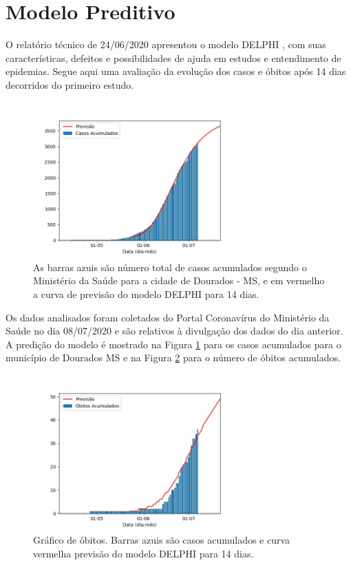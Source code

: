 \documentclass[12pt]{article}
\begin{document}
\section{Modelo Preditivo}\label{sec:predit}

O relatório técnico de 24/06/2020 apresentou o modelo DELPHI \cite{delphi}, com suas características, defeitos e possibilidades de ajuda em estudos e entendimento de epidemias. Segue aqui uma avaliação da evolução dos casos e óbitos após 14 dias decorridos do primeiro estudo. 

\begin{figure}[!htb]
  \centering
  \includegraphics[width = 8cm]{figs/Fig_Brasil_MS_Dourados_casos_20200708.jpg}
  \caption{As barras azuis são número total de casos acumulados segundo o Ministério da Saúde para a cidade de Dourados - MS, e em vermelho a curva de previsão do modelo DELPHI para 14 dias.}
  \label{proj_casos}
 \end{figure}
 
Os dados analisados foram coletados do Portal Coronavírus do Ministério da Saúde \cite{minsaude} no dia 08/07/2020 e são relativos à divulgação dos dados do dia anterior. A predição do modelo é mostrado na Figura \ref{proj_casos} para os casos acumulados para o município de Dourados MS e na Figura \ref{proj_obitos} para o número de óbitos acumulados.  

\begin{figure}[!htb]
  \centering
  \includegraphics[width=8cm]{figs/Fig_Brasil_MS_Dourados_obitos_20200708.jpg}
  \caption{Gráfico de óbitos. Barras azuis são casos acumulados e curva vermelha previsão do modelo DELPHI para 14 dias.}
  \label{proj_obitos}
 \end{figure}
\end{document}

